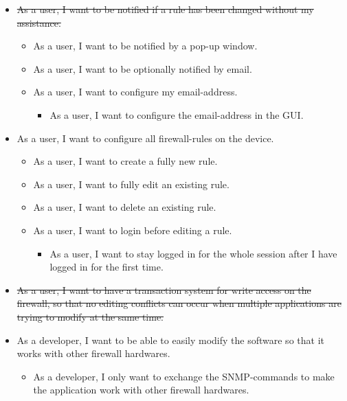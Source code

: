 \documentclass[11pt, a4paper]{article}
\begin{document}
\begin{itemize}
\item \sout{As a user, I want to be notified if a rule has been changed without my assistance.}
\begin{itemize}
\item As a user, I want to be notified by a pop-up window.
\item As a user, I want to be optionally notified by email.
\item As a user, I want to configure my email-address.
\begin{itemize}
\item As a user, I want to configure the email-address in the GUI.
\end{itemize}
\end{itemize}
\item As a user, I want to configure all firewall-rules on the device.
\begin{itemize}
\item As a user, I want to create a fully new rule.
\item As a user, I want to fully edit an existing rule.
\item As a user, I want to delete an existing rule.
\item As a user, I want to login before editing a rule.
\begin{itemize}
\item As a user, I want to stay logged in for the whole session after I have logged in for the first time.
\end{itemize}
\end{itemize}
\item \sout{As a user, I want to have a transaction system for write access on the firewall, so that no editing conflicts can occur when multiple applications are trying to modify at the same time.}
\item As a developer, I want to be able to easily modify the software so that it works with other firewall hardwares.
\begin{itemize}
\item As a developer, I only want to exchange the SNMP-commands to make the application work with other firewall hardwares.
\end{itemize}
\end{itemize}
\end{document}
